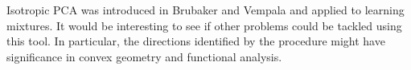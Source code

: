 \documentclass{book}
\numberwithin{exercise}{chapter}
\begin{document}
Isotropic PCA  was introduced in Brubaker and Vempala \cite{Brubaker2008} and applied to learning mixtures. It would be interesting to see if other problems could be tackled using this tool. In particular, the directions identified by the procedure might have significance in convex geometry and functional analysis.

\backmatter

%



\end{document}
